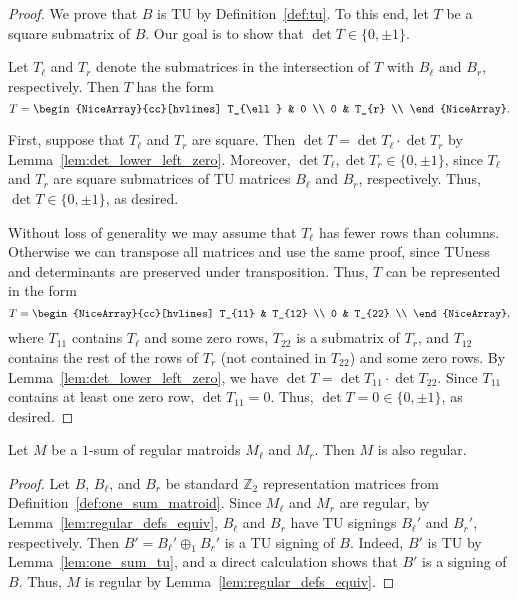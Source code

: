 \begin{proof}
    We prove that $B$ is TU by Definition~\ref{def:tu}. To this end, let $T$ be a square submatrix of $B$. Our goal is to show that $\det T \in \{0, \pm 1\}$.

    Let $T_{\ell}$ and $T_{r}$ denote the submatrices in the intersection of $T$ with $B_{\ell}$ and $B_{r}$, respectively. Then $T$ has the form
    \[
        T = \begin{NiceArray}{cc}[hvlines] T_{\ell} & 0 \\ 0 & T_{r} \\ \end{NiceArray}.
    \]

    First, suppose that $T_{\ell}$ and $T_{r}$ are square. Then $\det T = \det T_{\ell} \cdot \det T_{r}$ by Lemma~\ref{lem:det_lower_left_zero}. Moreover, $\det T_{\ell}, \det T_{r} \in \{0, \pm 1\}$, since $T_{\ell}$ and $T_{r}$ are square submatrices of TU matrices $B_{\ell}$ and $B_{r}$, respectively. Thus, $\det T \in \{0, \pm 1\}$, as desired.

    Without loss of generality we may assume that $T_{\ell}$ has fewer rows than columns. Otherwise we can transpose all matrices and use the same proof, since TUness and determinants are preserved under transposition. Thus, $T$ can be represented in the form
    \[
        T = \begin{NiceArray}{cc}[hvlines] T_{11} & T_{12} \\ 0 & T_{22} \\ \end{NiceArray},
    \]
    where $T_{11}$ contains $T_{\ell}$ and some zero rows, $T_{22}$ is a submatrix of $T_{r}$, and $T_{12}$ contains the rest of the rows of $T_{r}$ (not contained in $T_{22}$) and some zero rows. By Lemma~\ref{lem:det_lower_left_zero}, we have $\det T = \det T_{11} \cdot \det T_{22}$. Since $T_{11}$ contains at least one zero row, $\det T_{11} = 0$. Thus, $\det T = 0 \in \{0, \pm 1\}$, as desired.
\end{proof}

\begin{lemma}\label{lem:one_sum_regular}
    Let $M$ be a $1$-sum of regular matroids $M_{\ell}$ and $M_{r}$. Then $M$ is also regular.
\end{lemma}

\begin{proof}
    Let $B$, $B_{\ell}$, and $B_{r}$ be standard $\mathbb{Z}_{2}$ representation matrices from Definition~\ref{def:one_sum_matroid}. Since $M_{\ell}$ and $M_{r}$ are regular, by Lemma~\ref{lem:regular_defs_equiv}, $B_{\ell}$ and $B_{r}$ have TU signings $B_{\ell}'$ and $B_{r}'$, respectively. Then $B' = B_{\ell}' \oplus_{1} B_{r}'$ is a TU signing of $B$. Indeed, $B'$ is TU by Lemma~\ref{lem:one_sum_tu}, and a direct calculation shows that $B'$ is a signing of $B$. Thus, $M$ is regular by Lemma~\ref{lem:regular_defs_equiv}.
\end{proof}
